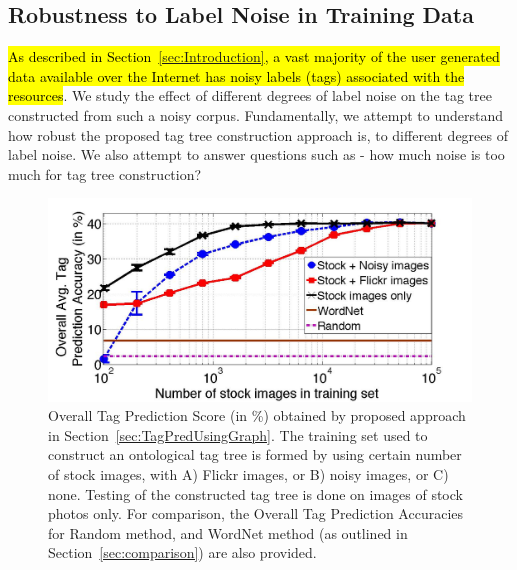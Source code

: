 \subsection{Robustness to Label Noise in Training Data}
\label{sec:RobustNoise}
\hl{As described in Section~{\ref{sec:Introduction}}, a vast majority of the user generated data available over the Internet has noisy labels (tags) associated with the resources}. We study the effect of different degrees of label noise on the tag tree constructed from such a noisy corpus. Fundamentally, we attempt to understand how robust the proposed tag tree construction approach is, to different degrees of label noise. We also attempt to answer questions such as - how much noise is too much for tag tree construction? 
\begin{figure}
\centering
\includegraphics[width=0.65\linewidth]{TagTree/journal_RobustnessFig}
\caption{Overall Tag Prediction Score (in \%) obtained by proposed approach in Section~\ref{sec:TagPredUsingGraph}. The training set used to construct an ontological tag tree is formed by using certain number of stock images, with A) Flickr images, or B) noisy images, or C) none. Testing of the constructed tag tree is done on images of stock photos only. For comparison, the Overall Tag Prediction Accuracies for Random method, and WordNet method (as outlined in Section~\ref{sec:comparison}) are also provided. 
} 
\label{fig:AddNoiseTrainingData}
\end{figure}

